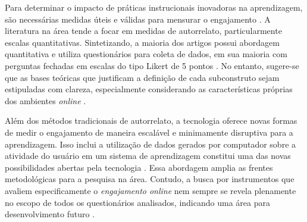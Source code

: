 Para determinar o impacto de práticas instrucionais inovadoras na aprendizagem, são necessárias medidas úteis e válidas para mensurar o engajamento \cite{henrieMeasuringStudentEngagement2015}. A literatura na área tende a focar em medidas de autorrelato, particularmente escalas quantitativas. Sintetizando, a maioria dos artigos possui abordagem quantitativa e utiliza questionários para coleta de dados, em sua maioria com perguntas fechadas em escalas do tipo Likert de 5 pontos \cite{ortegaMensuracaoEngajamentoOnline2022}. No entanto, sugere-se que as bases teóricas que justificam a definição de cada subconstruto sejam estipuladas com clareza, especialmente considerando as características próprias dos ambientes \textit{online} \cite{ortegaMensuracaoEngajamentoOnline2022}.

Além dos métodos tradicionais de autorrelato, a tecnologia oferece novas formas de medir o engajamento de maneira escalável e minimamente disruptiva para a aprendizagem. Isso inclui a utilização de dados gerados por computador sobre a atividade do usuário em um sistema de aprendizagem constitui uma das novas possibilidades abertas pela tecnologia \cite{dmelloAutoTutorAffectiveAutotutor2013}. Essa abordagem amplia as frentes metodológicas para a pesquisa na área. Contudo, a busca por instrumentos que avaliem especificamente o \textit{engajamento online} nem sempre se revela plenamente no escopo de todos os questionários analisados, indicando uma área para desenvolvimento futuro \cite{ortegaMensuracaoEngajamentoOnline2022}.
